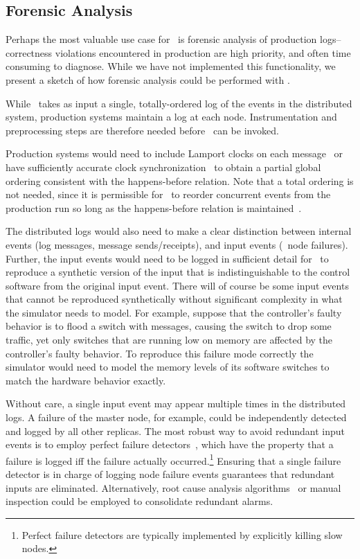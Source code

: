 \subsection{Forensic Analysis}

Perhaps the most valuable use case for \simulator~is forensic analysis of
production logs--correctness violations encountered in production are
high priority, and often time consuming to diagnose. While we have not
implemented this functionality, we present a sketch of
how forensic analysis could be performed with \simulator.

While \simulator~takes as input a single, totally-ordered log of the events in the
distributed system, production systems maintain a log at each node.
Instrumentation and preprocessing steps are therefore needed before \simulator~can be
invoked.

Production systems would need to include Lamport
clocks on each message~\cite{Lamport:1978:TCO:359545.359563} or have
sufficiently accurate clock
synchronization~\cite{corbett2012spanner} to obtain a partial global ordering
consistent with the happens-before relation.
Note that a total ordering is not needed, since it is permissible
for \simulator~to reorder concurrent events from
the production run so long as the happens-before relation is
maintained~\cite{Fischer:1985:IDC:3149.214121}.

The distributed logs would also need to make a clear distinction between internal events
(log messages, message sends/receipts), and input events (\eg~node failures). Further,
the input events would need to be logged in sufficient detail for \simulator~to
reproduce a synthetic version of the input that is indistinguishable to the control software
from the original input event. There will of course be some input events that cannot be reproduced
synthetically without significant complexity in what the simulator needs to model.
For example, suppose that the controller's faulty behavior is to flood a switch with messages,
causing the switch to drop some traffic, yet only switches that are running low on memory
are affected by the controller's faulty behavior. To reproduce this failure mode correctly
the simulator would need to model the memory levels of its software switches to match the
hardware behavior exactly.

Without care, a single input event may appear multiple times in the
distributed logs. A failure of the master node, for example, could be independently
detected and logged by all other replicas. The most robust way to
avoid redundant input events is to employ perfect failure
detectors~\cite{chandra1996unreliable}, which have the property that a
failure is logged iff
the failure actually occurred.\footnote{Perfect failure detectors are
typically implemented by explicitly killing slow
nodes.} Ensuring that a single failure detector is in charge of logging node failure
events guarantees that redundant inputs are eliminated. Alternatively, root cause analysis
algorithms~\cite{yemini1996} or manual inspection could be employed to consolidate redundant
alarms.

